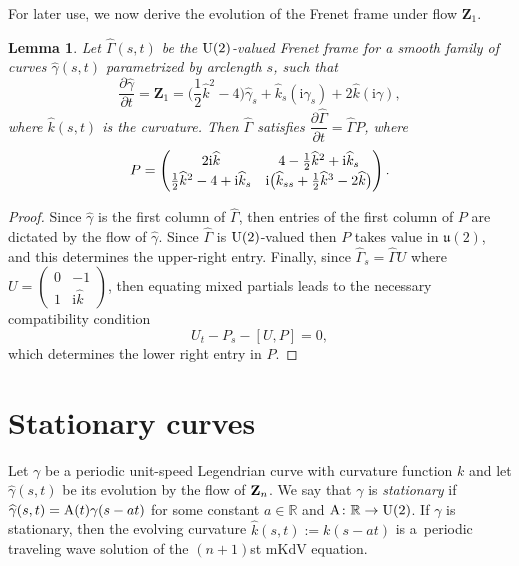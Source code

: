 \documentclass[10pt,a4paper]{amsart}
\newcommand\kk{k} %
\def\ri{\mathrm{i}}
\newcommand\VZ{\mathbf Z}
\def\gam{\gamma} %
\def\di{\partial}
\def\R{\mathbb R}
\newcommand\gamf{\widehat{\gam}} %
\newcommand\Gamf{\widehat{\Gamma}} %
\newcommand\kh{\widehat{\kk}} %
\numberwithin{equation}{section}
\newtheorem{Lemma}[Theorem]{Lemma}
\begin{document}
For later use, we now derive the evolution of the Frenet frame under flow $\VZ_1$.


\begin{Lemma}\label{FrenetEvolution} Let $\Gamf(s,t)$ be the ${\rm U}(2)$-valued Frenet frame for a smooth family of curves $\gamf(s,t)$ parametrized
by arclength $s$, such that
\[\dfrac{\di \gamf}{\di t} = \VZ_1 = \biggl(\frac12 \kh^2 -4\biggr) \gamf_s + \kh_s (\ri \gam_s) + 2\kh (\ri \gam),\]
where $\kh(s,t)$ is the curvature. Then $\Gamf$ satisfies $\dfrac{\di \Gamf}{\di t} = \Gamf P$, where
\begin{equation}\label{Z1flowPform}\renewcommand{\arraystretch}{1.2}
P = \begin{pmatrix} 2\ri \kh & 4 - \tfrac12 \kh^2 +\ri \kh_s \\ \tfrac12 \kh^2 -4 + \ri \kh_s & \ri \bigl(\kh_{ss} + \tfrac12\kh^3 -2\kh\bigr) \end{pmatrix}.
\end{equation}
\end{Lemma}
\begin{proof} Since $\gamf$ is the first column of $\Gamf$, then entries of the first column of $P$ are dictated by the flow of $\gamf$.
Since $\Gamf$ is ${\rm U}(2)$-valued then $P$ takes value in ${\mathfrak u}(2)$, and this determines the upper-right entry. Finally,
since $\Gamf_s = \Gamf U$ where $U=\left( \begin{smallmatrix} 0 & -1 \\ 1 & \ri\kh \end{smallmatrix} \right)$, then equating mixed partials leads to the necessary compatibility condition
\[U_t - P_s - [U,P] = 0,\]
which determines the lower right entry in $P$.
\end{proof}

\section{Stationary curves}\label{sec4}
\def\ki{\kk}
\def\gami{\gam}
\def\kf{\kh}

Let $\gami$ be a periodic unit-speed Legendrian curve {with curvature function $\ki$} and let $\gamf(s,t)$ be its evolution by the flow of ${\bf Z}_n$.
We say that $\gami$ is {\it stationary} if $\gamf(s,t)={\rm A}(t)\gami(s-at)$ for some constant $a\in \R$ and ${\rm A}\colon \R\to {\rm U}(2)$.
If $\gami$ is stationary, then the evolving curvature $\kf(s,t):=\ki(s-at)$ is a~periodic traveling wave solution of the $(n+1)$st mKdV equation.
\end{document}
